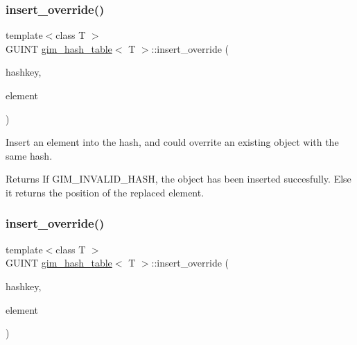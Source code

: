 \subsubsection{\texorpdfstring{insert\+\_\+override()}{insert\_override()}\hspace{0.1cm}{\footnotesize\ttfamily [1/2]}}
{\footnotesize\ttfamily template$<$class T $>$ \\
G\+U\+I\+NT \hyperlink{classgim__hash__table}{gim\+\_\+hash\+\_\+table}$<$ T $>$\+::insert\+\_\+override (\begin{DoxyParamCaption}\item[{G\+U\+I\+NT}]{hashkey,  }\item[{const T \&}]{element }\end{DoxyParamCaption})\hspace{0.3cm}{\ttfamily [inline]}}



Insert an element into the hash, and could overrite an existing object with the same hash. 

\begin{DoxyReturn}{Returns}
If G\+I\+M\+\_\+\+I\+N\+V\+A\+L\+I\+D\+\_\+\+H\+A\+SH, the object has been inserted succesfully. Else it returns the position of the replaced element. 
\end{DoxyReturn}
\mbox{\label{classgim__hash__table_a83987136757654921c71b183de8ec55e}} 
\subsubsection{\texorpdfstring{insert\+\_\+override()}{insert\_override()}\hspace{0.1cm}{\footnotesize\ttfamily [2/2]}}
{\footnotesize\ttfamily template$<$class T $>$ \\
G\+U\+I\+NT \hyperlink{classgim__hash__table}{gim\+\_\+hash\+\_\+table}$<$ T $>$\+::insert\+\_\+override (\begin{DoxyParamCaption}\item[{G\+U\+I\+NT}]{hashkey,  }\item[{const T \&}]{element }\end{DoxyParamCaption})\hspace{0.3cm}{\ttfamily [inline]}}



